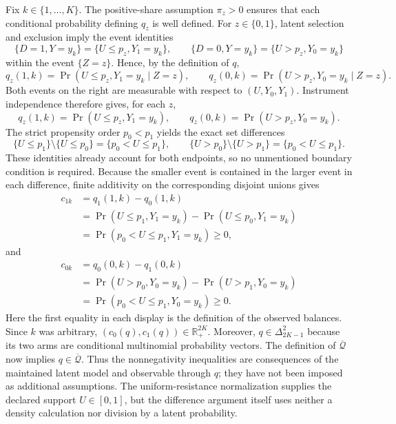 Fix \(k\in\{1,\ldots,K\}\).  The positive-share assumption \(\pi_z>0\) ensures that each conditional probability defining \(q_z\) is well defined.  For \(z\in\{0,1\}\), latent selection and exclusion imply the event identities
\[
\{D=1,Y=y_k\}=\{U\le p_z,Y_1=y_k\},\qquad
\{D=0,Y=y_k\}=\{U>p_z,Y_0=y_k\}
\]
within the event \(\{Z=z\}\).  Hence, by the definition of \(q\),
\[
q_z(1,k)=\Pr(U\le p_z,Y_1=y_k\mid Z=z),\qquad
q_z(0,k)=\Pr(U>p_z,Y_0=y_k\mid Z=z).
\]
Both events on the right are measurable with respect to \((U,Y_0,Y_1)\).  Instrument independence therefore gives, for each \(z\),
\[
q_z(1,k)=\Pr(U\le p_z,Y_1=y_k),\qquad
q_z(0,k)=\Pr(U>p_z,Y_0=y_k).
\]
The strict propensity order \(p_0<p_1\) yields the exact set differences
\[
\{U\le p_1\}\setminus\{U\le p_0\}=\{p_0<U\le p_1\},
\qquad
\{U>p_0\}\setminus\{U>p_1\}=\{p_0<U\le p_1\}.
\]
These identities already account for both endpoints, so no unmentioned boundary condition is required.  Because the smaller event is contained in the larger event in each difference, finite additivity on the corresponding disjoint unions gives
\[
\begin{aligned}
c_{1k}
&=q_1(1,k)-q_0(1,k)\\
&=\Pr(U\le p_1,Y_1=y_k)-\Pr(U\le p_0,Y_1=y_k)\\
&=\Pr(p_0<U\le p_1,Y_1=y_k)\ge0,
\end{aligned}
\]
and
\[
\begin{aligned}
c_{0k}
&=q_0(0,k)-q_1(0,k)\\
&=\Pr(U>p_0,Y_0=y_k)-\Pr(U>p_1,Y_0=y_k)\\
&=\Pr(p_0<U\le p_1,Y_0=y_k)\ge0.
\end{aligned}
\]
Here the first equality in each display is the definition of the observed balances.  Since \(k\) was arbitrary, \((c_0(q),c_1(q))\in\mathbb R_+^{2K}\).  Moreover, \(q\in\Delta_{2K-1}^2\) because its two arms are conditional multinomial probability vectors.  The definition of \(\overline{\mathcal Q}\) now implies \(q\in\overline{\mathcal Q}\).  Thus the nonnegativity inequalities are consequences of the maintained latent model and observable through \(q\); they have not been imposed as additional assumptions.  The uniform-resistance normalization supplies the declared support \(U\in[0,1]\), but the difference argument itself uses neither a density calculation nor division by a latent probability.
